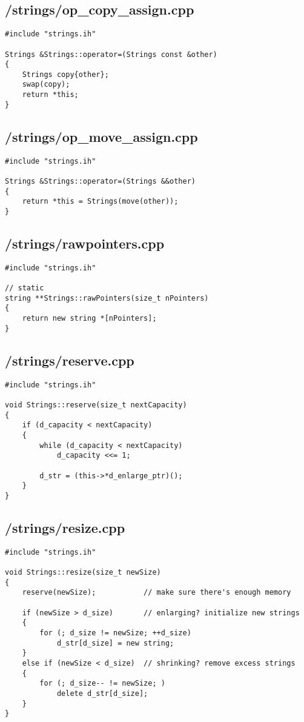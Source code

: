 \documentclass{article}
\begin{document}
\subsection*{/strings/op\_copy\_assign.cpp}
\begin{verbatim}
#include "strings.ih"

Strings &Strings::operator=(Strings const &other)
{
    Strings copy{other};
    swap(copy);
    return *this;
}
\end{verbatim}
\subsection*{/strings/op\_move\_assign.cpp}
\begin{verbatim}
#include "strings.ih"

Strings &Strings::operator=(Strings &&other)
{
    return *this = Strings(move(other));
}
\end{verbatim}
\subsection*{/strings/rawpointers.cpp}
\begin{verbatim}
#include "strings.ih"

// static
string **Strings::rawPointers(size_t nPointers)
{
    return new string *[nPointers];
}

\end{verbatim}
\subsection*{/strings/reserve.cpp}
\begin{verbatim}
#include "strings.ih"

void Strings::reserve(size_t nextCapacity)
{
    if (d_capacity < nextCapacity)
    {
        while (d_capacity < nextCapacity)
            d_capacity <<= 1;
        
        d_str = (this->*d_enlarge_ptr)();
    }
}

\end{verbatim}
\subsection*{/strings/resize.cpp}
\begin{verbatim}
#include "strings.ih"

void Strings::resize(size_t newSize)
{
    reserve(newSize);           // make sure there's enough memory

    if (newSize > d_size)       // enlarging? initialize new strings
    {
        for (; d_size != newSize; ++d_size)
            d_str[d_size] = new string;
    }
    else if (newSize < d_size)  // shrinking? remove excess strings
    {
        for (; d_size-- != newSize; )
            delete d_str[d_size];
    }
}

\end{verbatim}
\end{document}
